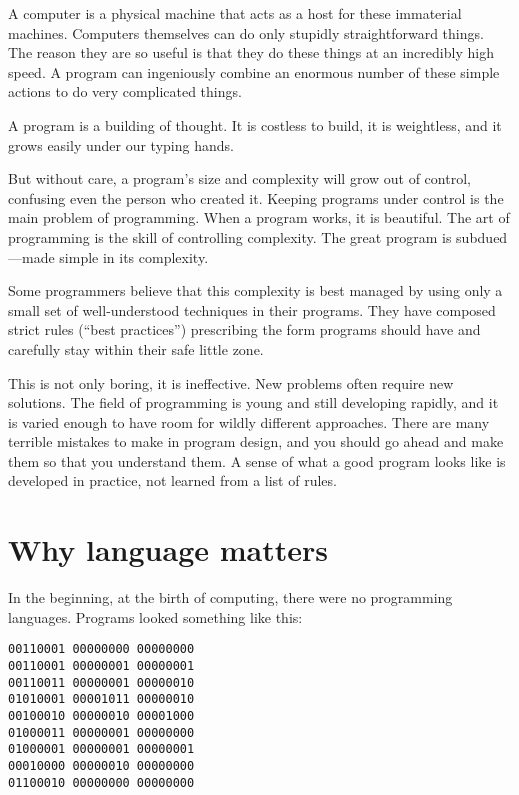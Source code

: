A computer is a physical machine that acts as a host for these immaterial machines. Computers themselves can do only stupidly straightforward things. The reason they are so useful is that they do these things at an incredibly high speed. A program can ingeniously combine an enormous number of these simple actions to do very complicated things.

A program is a building of thought. It is costless to build, it is weightless, and it grows easily under our typing hands.

But without care, a program's size and complexity will grow out of control, confusing even the person who created it. Keeping programs under control is the main problem of programming. When a program works, it is beautiful. The art of programming is the skill of controlling complexity. The great program is subdued—made simple in its complexity.

Some programmers believe that this complexity is best managed by using only a small set of well-understood techniques in their programs. They have composed strict rules (``best practices'') prescribing the form programs should have and carefully stay within their safe little zone.

This is not only boring, it is ineffective. New problems often require new solutions. The field of programming is young and still developing rapidly, and it is varied enough to have room for wildly different approaches. There are many terrible mistakes to make in program design, and you should go ahead and make them so that you understand them. A sense of what a good program looks like is developed in practice, not learned from a list of rules.

\section{Why language matters}

In the beginning, at the birth of computing, there were no programming languages. Programs looked something like this:

\begin{lstlisting}
00110001 00000000 00000000
00110001 00000001 00000001
00110011 00000001 00000010
01010001 00001011 00000010
00100010 00000010 00001000
01000011 00000001 00000000
01000001 00000001 00000001
00010000 00000010 00000000
01100010 00000000 00000000
\end{lstlisting}
\noindent{}

